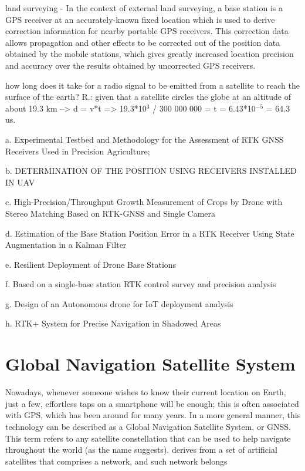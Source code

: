 \begin{itemize}
        land surveying - In the context of external land surveying, a base station is a GPS receiver at an accurately-known fixed location which is used to derive correction information for nearby portable GPS receivers. This correction data allows propagation and other effects to be corrected out of the position data obtained by the mobile stations, which gives greatly increased location precision and accuracy over the results obtained by uncorrected GPS receivers.

        how long does it take for a radio signal to be emitted from a satellite to reach the surface of the earth? 
        R.: given that a satellite circles the globe at an altitude of about 19.3 km --> d = v*t => 19.3*10$^3$ / 300 000 000 = t = 6.43*10$^{-5}$ = 64.3 us.

    a. Experimental Testbed and Methodology for the
    Assessment of RTK GNSS Receivers Used
    in Precision Agriculture;

    b. DETERMINATION OF THE POSITION USING
    RECEIVERS INSTALLED IN UAV

    c. High-Precision/Throughput Growth Measurement of
    Crops by Drone with Stereo Matching Based on
    RTK-GNSS and Single Camera

    d. Estimation of the Base Station Position Error in a
    RTK Receiver Using State Augmentation in a
    Kalman Filter

    e. Resilient Deployment of Drone Base Stations

    f. Based on a single-base station RTK control survey
    and precision analysis 

    g. Design of an Autonomous drone for IoT deployment
    analysis 

    h. RTK+ System for Precise Navigation in Shadowed
    Areas 
\end{itemize}

\section{Global Navigation Satellite System}\label{sec:II_gnss}

Nowadays, whenever someone wishes to know their current location on Earth, just a few, effortless taps on a smartphone will be enough; this is often associated with GPS, which has been around for many years. In a more general manner, this technology can be described as a Global Navigation Satellite System, or GNSS. This term refers to any satellite constellation that can be used to help navigate throughout the world (as the name suggests). derives from a set of artificial satellites that comprises a network, and such network belongs 


